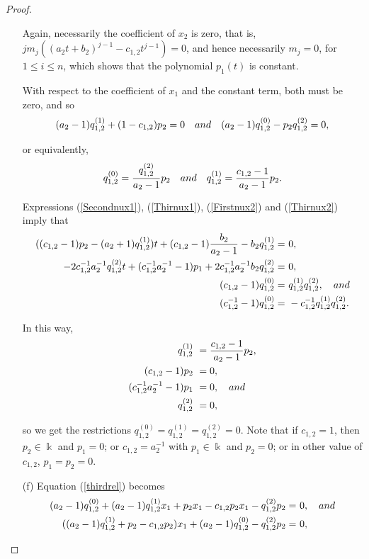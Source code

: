 \documentclass{amsart}
\theoremstyle{definition}
\theoremstyle{remark}
\numberwithin{equation}{section}
\begin{document}
\begin{proof}
\begin{enumerate}
Again, necessarily the coefficient of $x_2$ is zero, that is, $jm_j((a_2t+b_2)^{j-1}-c_{1,2}t^{j-1}) = 0$, and hence necessarily $m_j=0$, for $1 \leq i \leq n$, which shows that the polynomial $p_1(t)$ is constant.

With respect to the coefficient of $x_1$ and the constant term, both must be zero, and so
    \begin{equation*}
       (a_2-1)q_{1,2}^{(1)}+(1-c_{1,2})p_2 = 0 \quad {\rm and} \quad (a_2-1)q_{1,2}^{(0)}-p_2q_{1,2}^{(2)}=0,
    \end{equation*}

or equivalently,
    \begin{equation*}
        q_{1,2}^{(0)}=\frac{q_{1,2}^{(2)}}{a_2-1}p_2 \quad {\rm and} \quad q_{1,2}^{(1)}=\frac{c_{1,2}-1}{a_2-1}p_2. 
    \end{equation*}
    
Expressions {\rm (}\ref{Secondnux1}{\rm )}, {\rm (}\ref{Thirnux1}{\rm )}, {\rm (}\ref{Firstnux2}{\rm )} and {\rm (}\ref{Thirnux2}{\rm )} imply that 
    \begin{align*}
     ((c_{1,2}-1)p_2-(a_2+1)q_{1,2}^{(1)})t+(c_{1,2}-1)\frac{b_2}{a_2-1}-b_2q_{1,2}^{(1)} = &\ 0, \\
 -2c_{1,2}^{-1}a_2^{-1}q_{1,2}^{(2)}t+(c_{1,2}^{-1}a_2^{-1}-1)p_1+2c_{1,2}^{-1}a_2^{-1}b_2q_{1,2}^{(2)} = &\ 0, \\
(c_{1,2}-1)q_{1,2}^{(0)} = &\ q_{1,2}^{(1)}q_{1,2}^{(2)}, \quad {\rm and} \\
(c_{1,2}^{-1}-1)q_{1,2}^{(0)} = &\ -c_{1,2}^{-1}q_{1,2}^{(1)}q_{1,2}^{(2)}.
    \end{align*}
    
In this way,
    \begin{align*}
         q_{1,2}^{(1)}&\ =\frac{c_{1,2}-1}{a_2-1}p_2, \\
        (c_{1,2}-1)p_2&\ =0, \\
         (c_{1,2}^{-1}a_2^{-1}-1)p_1&\ =0,  \quad {\rm and} \\
         q_{1,2}^{(2)}&\ =0,
    \end{align*}
    
so we get the restrictions $q_{1,2}^{(0)}=q_{1,2}^{(1)}=q_{1,2}^{(2)}=0$. Note that if $c_{1,2}=1$, then $p_2\in\Bbbk$ and $p_1=0$; or $c_{1,2}=a_2^{-1}$ with $p_1\in \Bbbk$ and $p_2=0$; or in other value of $c_{1,2}$, $p_1=p_2=0$.
    \item [\rm (f)] Equation (\ref{thirdrel}) becomes
    \begin{align*}
        (a_2-1)q_{1,2}^{(0)}+(a_2-1)q_{1,2}^{(1)}x_1+p_2x_1-c_{1,2}p_2x_1-q_{1,2}^{(2)}p_2 = &\ 0, \quad {\rm and} \\
     ((a_2-1)q_{1,2}^{(1)}+p_2-c_{1,2}p_2)x_1+(a_2-1)q_{1,2}^{(0)}-q_{1,2}^{(2)}p_2 = &\ 0,
    \end{align*}
    

\end{enumerate}
\end{proof}
\end{document}
